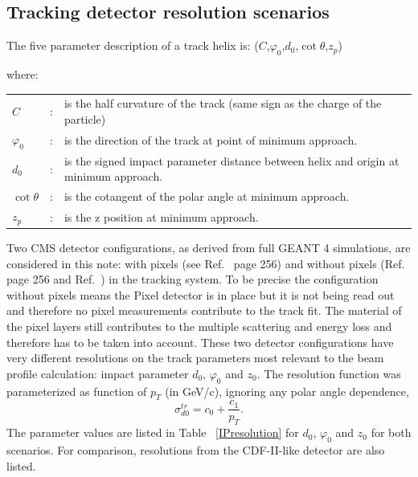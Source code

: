 \documentclass{cmspaper}
\begin{document}
\newpage
\subsection{\label{sec:resol}Tracking detector resolution scenarios}

The five parameter description of a track helix is: 
($C$,$\varphi_0$,$d_0$,$\cot\theta$,$z_p$)

where:\\
\begin{tabular}{lcl}
$C$         &:& is the half curvature of the track (same sign as the charge of the particle)\\
$\varphi_0$ &:& is the direction of the track at point of minimum approach.\\
$d_0$         &:& is the signed impact parameter distance between helix and origin at minimum approach.\\
$\cot\theta$ &:& is the cotangent of the polar angle at minimum approach.\\
$z_p$       &:& is the z position at minimum approach.\\
\end{tabular}

Two CMS detector configurations, as derived from full GEANT 4 simulations, are considered in this note: with pixels (see Ref.~\cite{PhysTDCVol1} page 256) and 
without pixels (Ref.~\cite{PhysTDCVol1} page 256 and Ref.~\cite{IPnopixel}) in 
the tracking system. To be precise the configuration without pixels means the Pixel detector is in place but it is not being read out and therefore no pixel measurements 
contribute to the track fit. The material of the pixel layers still contributes to the multiple scattering and energy loss and therefore has to be taken into account. 
These two detector configurations have very different resolutions 
on the track parameters most relevant to the beam profile calculation: impact 
parameter $d_0$, $\varphi_0$ and  $z_0$.  The resolution function was parameterized as function of $p_T$ (in GeV/c), ignoring any polar angle dependence, 
\begin{equation}
 \label{ptpara}
\sigma^{tr}_{d0} = c_0 + \frac{c_1}{p_T}.
\end{equation} 
The parameter values are listed in Table ~\ref{IPresolution} 
for $d_0$,  $\varphi_0$ and  $z_0$ for both scenarios.   For comparison, resolutions from the CDF-II-like detector are also listed.
\end{document}
